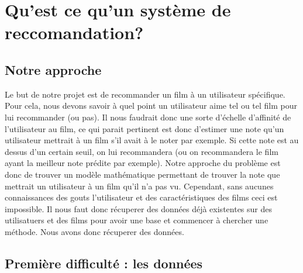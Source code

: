 \documentclass[a4paper,10pt]{article}
\title{}
\author{}
\begin{document}
\maketitle

\begin{abstract}
\end{abstract}

\section{Qu'est ce qu'un système de reccomandation?}
\subsection{Notre approche}
Le but de notre projet est de recommander un film à un utilisateur spécifique. 
Pour cela, nous devons savoir à quel point un utilisateur aime tel ou tel film pour lui recommander (ou pas). 
Il nous faudrait donc une sorte d'échelle d'affinité de l'utilisateur au film, ce qui parait pertinent est donc d'estimer une note qu'un utilisateur mettrait à un film s'il avait à le noter par exemple. 
Si cette note est au dessus d'un certain seuil, on lui recommandera (ou on recommandera le film ayant la meilleur note prédite par exemple). 
Notre approche du problème est donc de trouver un modèle mathématique permettant de trouver la note que mettrait un utilisateur à un film qu'il n'a pas vu. 
Cependant, sans aucunes connaissances des gouts l'utilisateur et des caractéristiques des films ceci est impossible. Il nous faut donc récuperer des données déjà existentes sur des utilisatuers et des films pour avoir une base et commencer à chercher une méthode.  
Nous avons donc récuperer des données.

\subsection{Première difficulté : les données}
\end{document}
